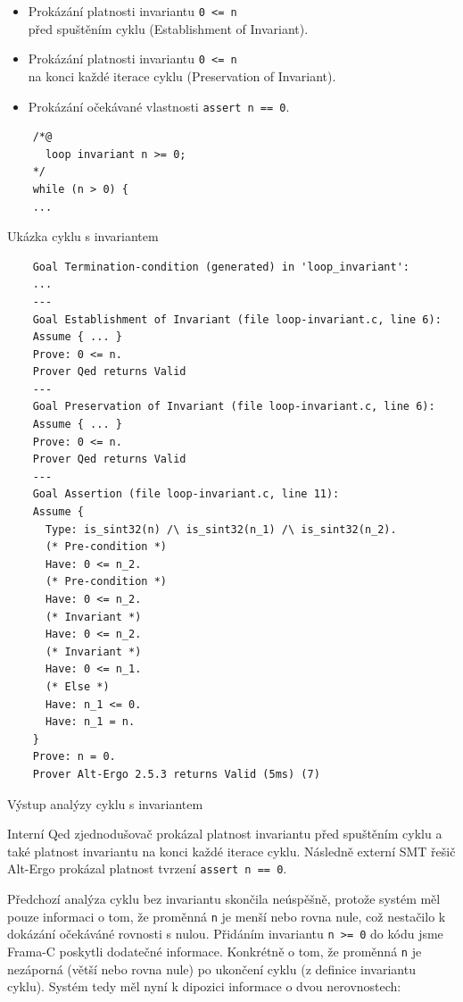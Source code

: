 \begin{itemize}
    \item Prokázání platnosti invariantu \texttt{0 <= n} \\
    před spuštěním cyklu (Establishment of Invariant).
    \item Prokázání platnosti invariantu \texttt{0 <= n} \\
    na konci každé iterace cyklu (Preservation of Invariant).
    \item Prokázání očekávané vlastnosti \texttt{assert n == 0}.
\end{itemize}

\begin{listing}[H]
    \begin{verbatim}
    /*@
      loop invariant n >= 0;
    */
    while (n > 0) {
    ...
    \end{verbatim}
    \caption{Ukázka cyklu s invariantem}
    \label{list:loop-with-invariant}
\end{listing}

\begin{listing}[H]
    \begin{verbatim}
    Goal Termination-condition (generated) in 'loop_invariant':
    ...
    ---
    Goal Establishment of Invariant (file loop-invariant.c, line 6):
    Assume { ... }
    Prove: 0 <= n.
    Prover Qed returns Valid
    ---
    Goal Preservation of Invariant (file loop-invariant.c, line 6):
    Assume { ... }
    Prove: 0 <= n.
    Prover Qed returns Valid
    ---
    Goal Assertion (file loop-invariant.c, line 11):
    Assume {
      Type: is_sint32(n) /\ is_sint32(n_1) /\ is_sint32(n_2).
      (* Pre-condition *)
      Have: 0 <= n_2.
      (* Pre-condition *)
      Have: 0 <= n_2.
      (* Invariant *)
      Have: 0 <= n_2.
      (* Invariant *)
      Have: 0 <= n_1.
      (* Else *)
      Have: n_1 <= 0.
      Have: n_1 = n.
    }
    Prove: n = 0.
    Prover Alt-Ergo 2.5.3 returns Valid (5ms) (7)
    \end{verbatim}
    \caption{Výstup analýzy cyklu s invariantem}
    \label{list:loop-with-invariant-output}
\end{listing}

Interní Qed zjednodušovač prokázal platnost invariantu před spuštěním cyklu a také platnost invariantu na konci každé iterace cyklu.
Následně externí SMT řešič Alt-Ergo prokázal platnost tvrzení \texttt{assert n == 0}.

Předchozí analýza cyklu bez invariantu skončila neúspěšně,
protože systém měl pouze informaci o tom, že proměnná \texttt{n} je menší nebo rovna nule,
což nestačilo k dokázání očekáváné rovnosti s nulou.
Přidáním invariantu \texttt{n~>=~0} do kódu jsme Frama\mbox{-}C poskytli dodatečné informace.
Konkrétně o tom, že proměnná \texttt{n} je nezáporná (větší nebo rovna nule) po ukončení cyklu (z definice invariantu cyklu).
Systém tedy měl nyní k dipozici informace o dvou nerovnostech:

